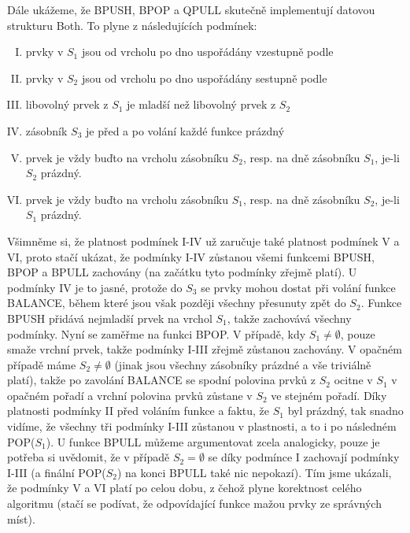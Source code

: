 \documentclass[12pt,a4paper]{article}
\theoremstyle{plain}
\begin{document}
\begin{enumerate}[a)]
Dále ukážeme, že BPUSH, BPOP a QPULL skutečně implementují datovou strukturu Both. To plyne z následujících podmínek:
\begin{enumerate}[I.]
\item prvky v $S_1$ jsou od vrcholu po dno uspořádány vzestupně podle 
\item prvky v $S_2$ jsou od vrcholu po dno uspořádány sestupně podle 
\item libovolný prvek z $S_1$ je mladší než libovolný prvek z $S_2$
\item zásobník $S_3$ je před a po volání každé funkce prázdný
\item {} prvek je vždy buďto na vrcholu zásobníku $S_2$, resp. na dně zásobníku
 $S_1$, je-li $S_2$ prázdný.
\item {} prvek je vždy buďto na vrcholu zásobníku $S_1$, resp. na dně zásobníku
 $S_2$, je-li $S_1$ prázdný.
\end{enumerate}
Všimněme si, že platnost podmínek I-IV už zaručuje také platnost podmínek V a VI, proto stačí ukázat, že podmínky I-IV zůstanou všemi funkcemi BPUSH, BPOP a BPULL zachovány (na začátku tyto podmínky zřejmě platí). U podmínky IV je to jasné, protože do $S_3$ se prvky mohou dostat při volání funkce BALANCE, během které jsou však později všechny přesunuty zpět do $S_2$. Funkce BPUSH přidává nejmladší prvek na vrchol $S_1$, takže zachovává všechny podmínky. Nyní se zaměřme na funkci BPOP. V případě, kdy $S_1\neq\emptyset$, pouze smaže vrchní prvek, takže podmínky I-III zřejmě zůstanou zachovány. V opačném případě máme $S_2\neq\emptyset$ (jinak jsou všechny zásobníky prázdné a vše triviálně platí), takže po zavolání BALANCE se spodní polovina prvků z $S_2$ ocitne v $S_1$ v opačném pořadí a vrchní polovina prvků zůstane v $S_2$ ve stejném pořadí. Díky platnosti podmínky II před voláním funkce a faktu, že $S_1$ byl prázdný, tak snadno vidíme, že všechny tři podmínky I-III zůstanou v plastnosti, a to i po následném POP($S_1$). U funkce BPULL můžeme argumentovat zcela analogicky, pouze je potřeba si uvědomit, že v případě $S_2=\emptyset$ se díky podmínce I zachovají podmínky I-III (a finální POP($S_2$) na konci BPULL také nic nepokazí). Tím jsme ukázali, že podmínky V a VI platí po celou dobu, z čehož plyne korektnost celého algoritmu (stačí se podívat, že odpovídající funkce mažou prvky ze správných míst).


\end{enumerate}
\end{document}
